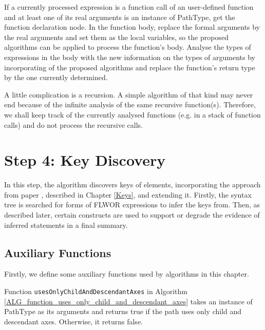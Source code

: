 If a currently processed expression is a function call of an user-defined function and at least one of its real arguments is an instance of PathType, get the function declaration node. In the function body, replace the formal arguments by the real arguments and set them as the local variables, so the proposed algorithms can be applied to process the function's body. Analyse the types of expressions in the body with the new information on the types of arguments by incorporating of the proposed algorithms and replace the function's return type by the one currently determined.

A little complication is a recursion. A simple algorithm of that kind may never end because of the infinite analysis of the same recursive function(s). Therefore, we shall keep track of the currently analysed functions (e.g. in a stack of function calls) and do not process the recursive calls. 


\section{Step 4: Key Discovery}
In this step, the algorithm discovers keys of elements, incorporating the approach from paper \cite{Necasky:2009:DXK:1529282.1529414}, described in Chapter \ref{Keys}, and extending it. Firstly, the syntax tree is searched for forms of FLWOR expressions to infer the keys from. Then, as described later, certain constructs are used to support or degrade the evidence of inferred statements in a final summary.

\subsection{Auxiliary Functions} \label{step_4_auxiliary_functions}
Firstly, we define some auxiliary functions used by algorithms in this chapter.

Function \texttt{usesOnlyChildAndDescendantAxes} in Algorithm \ref{ALG_function_uses_only_child_and_descendant_axes} takes an instance of PathType as its arguments and returns true if the path uses only child and descendant axes. Otherwise, it returns false.

